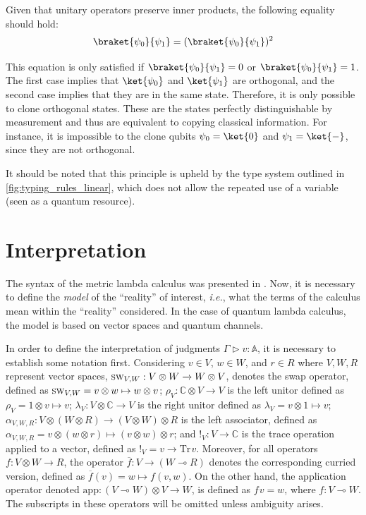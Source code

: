 Given that unitary operators preserve inner products, the following equality should hold:
\begin{equation*}
  \braket{\psi_0}{\psi_1} = ( \braket{\psi_0}{\psi_1})^{2}
\end{equation*}

This equation is only satisfied if $\braket{\psi_0}{\psi_1} = 0$ or $\braket{\psi_0}{\psi_1} = 1$. The first case implies that $\ket{\psi_0}$ and $\ket{\psi_1}$ are orthogonal, and the second case implies that they are in the same state. Therefore, it is only possible to clone orthogonal states. These are the states perfectly distinguishable by measurement and thus are equivalent to copying classical information. For instance, it is impossible to the clone qubits $\psi_0 = \ket{0}$ and $\psi_1 = \ket{-}$, since they are not orthogonal.

It should be noted that this principle is upheld by the type system outlined in \autoref{fig:typing_rules_linear}, which does not allow the repeated use of a variable (seen as a quantum resource).




\section{Interpretation} \label{sec:Quantum Lambda Calculus:Interpretation}
The syntax of the metric lambda calculus was presented in . Now, it is necessary to define the \emph{model} of the ``reality'' of interest, \textit{i.e.}, what the terms of the calculus mean within the ``reality'' considered. In the case of quantum lambda calculus, the model is based on vector spaces and quantum channels. 

In order to define the interpretation of judgments $\Gamma \triangleright v: \mathbb{A}$, it is necessary to establish some notation first. Considering $v \in V$, $w \in W$, and $r \in R$  where $V, W, R$ represent vector spaces,  $\textsc{sw}_{V,W} : V\otimes W \xrightarrow{} W \otimes V$, denotes the swap operator, defined as $\textsc{sw}_{V,W}= v\otimes w \mapsto w \otimes v$;    $\rho_{V} : \mathbb{C} \otimes V \xrightarrow{} V $ is the left unitor defined as $\rho_{V}= 1 \otimes v \mapsto v $; $\lambda_{V} : V  \otimes \mathbb{C} \xrightarrow{} V $ is the right unitor defined as $\lambda_{V}= v \otimes 1 \mapsto v$; $\alpha_{V,W,R} : V  \otimes (W \otimes R) \xrightarrow{} (V  \otimes W) \otimes R$ is the left associator, defined as $\alpha_{V,W,R}= v \otimes (w \otimes r) \mapsto (v \otimes w) \otimes r $; and $!_{V}: V \xrightarrow{} \mathbb{C}$ is the trace operation applied to a vector, defined as  $!_{V}= v \xrightarrow{} \text{Tr} \hspace{1pt}v$. Moreover, for all operators $f: V \otimes W \xrightarrow{} R$, the operator $\overline{f} : V \xrightarrow{} (W \multimap R)$ denotes the corresponding curried version, defined as $\overline{f}(v) = w \mapsto  f(v,w)$. On the other hand, the application operator denoted $\text{app}: (V \multimap W) \otimes V \rightarrow W$, is defined as $f\hspace{1pt} v = w $, where $f: V \multimap W $.   The subscripts in these operators will be omitted unless ambiguity arises. 

